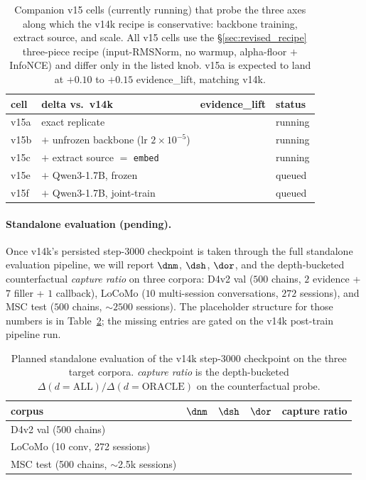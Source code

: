 \begin{table}[t]
\centering
\caption{Companion v15 cells (currently running) that probe the
three axes along which the v14k recipe is conservative: backbone
training, extract source, and scale. All v15 cells use the
\S\ref{sec:revised_recipe} three-piece recipe (input-RMSNorm,
no warmup, alpha-floor $+$ InfoNCE) and differ only in the listed
knob. v15a is expected to land at $+0.10$ to $+0.15$
evidence\_lift, matching v14k.}
\label{tab:v15_pending}
\small
\begin{tabular}{llcl}
\toprule
cell & delta vs.\ v14k & evidence\_lift & status \\
\midrule
v15a & exact replicate                              & \todo{} & running \\
v15b & $+$ unfrozen backbone (lr $2{\times}10^{-5}$) & \todo{} & running \\
v15c & $+$ extract source $=$ \texttt{embed}         & \todo{} & running \\
v15e & $+$ Qwen3-1.7B, frozen                       & \todo{} & queued  \\
v15f & $+$ Qwen3-1.7B, joint-train                  & \todo{} & queued  \\
\bottomrule
\end{tabular}
\end{table}

\paragraph{Standalone evaluation (pending).}
Once v14k's persisted step-$3000$ checkpoint is taken through the
full standalone evaluation pipeline, we will report
$\dnm$, $\dsh$, $\dor$, and the depth-bucketed counterfactual
\emph{capture ratio} on three corpora: D4v2 val
($500$ chains, $2$ evidence + $7$ filler + $1$ callback), LoCoMo
($10$ multi-session conversations, $272$ sessions), and MSC test
($500$ chains, $\sim 2500$ sessions). The placeholder structure for
those numbers is in Table~\ref{tab:v14k_standalone}; the missing
entries are gated on the v14k post-train pipeline run.

\begin{table}[t]
\centering
\caption{Planned standalone evaluation of the v14k step-$3000$
checkpoint on the three target corpora. \emph{capture ratio}
is the depth-bucketed
$\Delta(d{=}\mathrm{ALL}) / \Delta(d{=}\mathrm{ORACLE})$ on the
counterfactual probe.}
\label{tab:v14k_standalone}
\small
\begin{tabular}{lrrrr}
\toprule
corpus & $\dnm$ & $\dsh$ & $\dor$ & capture ratio \\
\midrule
D4v2 val (500 chains)            & \todo{} & \todo{} & \todo{} & \todo{} \\
LoCoMo (10 conv, 272 sessions)   & \todo{} & \todo{} & \todo{} & \todo{} \\
MSC test (500 chains, $\sim$2.5k sessions) & \todo{} & \todo{} & \todo{} & \todo{} \\
\bottomrule
\end{tabular}
\end{table}
